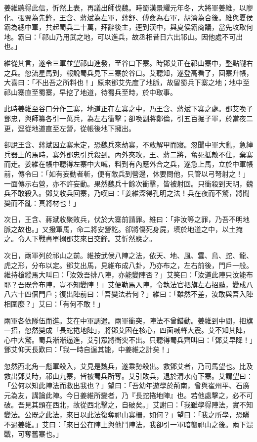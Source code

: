 姜維聽得此信，忻然上表，再議出師伐魏。時蜀漢景耀元年冬，大將軍姜維，以廖化、張翼為先鋒，王含、蔣斌為左軍，蔣舒、傅僉為右軍，胡濟為合後。維與夏侯霸為總中軍，共起蜀兵二十萬，拜辭後主，逕到漢中，與夏侯霸商議，當先攻取何地。霸曰：「祁山乃用武之地，可以進兵，故丞相昔日六出祁山。因他處不可出也。」

維從其言，遂令三軍並望祁山進發，至谷口下寨。時鄧艾正在祁山寨中，整點隴右之兵。忽流星馬到，報說蜀兵見下三寨於谷口。艾聽知，遂登高看了，回寨升帳，大喜曰：「不出吾之所料也！」原來鄧艾先度了地脈，故留蜀兵下寨之地；地中至祁山寨直至蜀寨，早挖了地道，待蜀兵至時，於中取事。

此時姜維至谷口分作三寨，地道正在左寨之中，乃王含、蔣斌下寨之處。鄧艾喚子鄧忠，與師纂各引一萬兵，為左右衝擊；卻喚副將鄭倫，引五百掘子軍，於當夜二更，逕從地道直至左營，從帳後地下擁出。

卻說王含、蔣斌因立寨未定，恐魏兵來劫寨，不敢解甲而寢。忽聞中軍大亂，急綽兵器上的馬時，寨外鄧忠引兵殺到。內外夾攻，王、蔣二將，奮死抵敵不住，棄寨而走。姜維在帳中聽得左寨中大喊，料到有內應外合之兵，遂急上馬，立於中軍帳前，傳令曰：「如有妄動者斬，便有敵兵到營邊，休要問他，只管以弓弩射之！」一面傳示右營，亦不許妄動。果然魏兵十餘次衝擊，皆被射回。只衝殺到天明，魏兵不敢殺入。鄧艾收兵回寨，乃嘆曰：「姜維深得孔明之法！兵在夜而不驚，將聞變而不亂：真將材也！」

次日，王含、蔣斌收聚敗兵，伏於大寨前請罪。維曰：「非汝等之罪，乃吾不明地脈之故也。」又撥軍馬，命二將安營訖。卻將傷死身屍，填於地道之中，以土掩之。令人下戰書單搦鄧艾來日交鋒。艾忻然應之。

次日，兩軍列於祁山之前。維按武侯八陣之法，依天、地、風、雲、鳥、蛇、龍、虎之形，分布以定。鄧艾出馬，見維布成八卦，乃亦布之，左右前後，門戶一般。維持槍縱馬大叫曰：「汝效吾排八陣，亦能變陣否？」艾笑曰：「汝道此陣只汝能布耶？吾既會布陣，豈不知變陣！」艾便勒馬入陣，令執法官把旗左右招颭，變成八八六十四個門戶；復出陣前曰：「吾變法若何？」維曰：「雖然不差，汝敢與吾入陣相圍麼？」艾曰：「有何不敢！」

兩軍各依隊伍而進。艾在中軍調遣。兩軍衝突，陣法不曾錯動。姜維到中間，把旗一招，忽然變成「長蛇捲地陣」，將鄧艾困在核心，四面喊聲大震。艾不知其陣，心中大驚。蜀兵漸漸逼進，艾引眾將衝突不出。只聽得蜀兵齊叫曰：「鄧艾早降！」鄧艾仰天長歎曰：「我一時自逞其能，中姜維之計矣！」

忽然西北角一彪軍殺入，艾見是魏兵，遂乘勢殺出。救鄧艾者，乃司馬望也。比及救出鄧艾時，祁山九寨，皆被蜀兵所奪。艾引敗兵，退於渭水南下寨。艾謂望曰：「公何以知此陣法而救出我也？」望曰：「吾幼年遊學於荊南，曾與崔州平、石廣元為友，講論此陣。今日姜維所變者，乃『長蛇捲地陣』也。若他處擊之，必不可破。吾見其頭在西北，故從西北擊之，自破矣。」艾謝曰：「我雖學得陣法，實不知變法。公既之此法，來日以此法復奪祁山寨柵，如何？」望曰：「我之所學，恐瞞不過姜維。」艾曰：「來日公在陣上與他鬥陣法，我卻引一軍暗襲祁山之後。兩下混戰，可奪舊寨也。」

